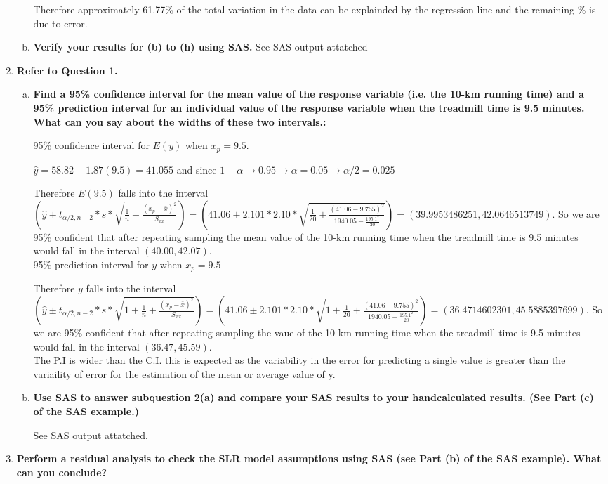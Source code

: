 \documentclass{article}
\begin{document}
\begin{enumerate}[1.]
\begin{enumerate}[(a)]
Therefore approximately 61.77\% of the total variation in the data can be explainded by the regression line and the remaining \% is due to error.

  \item \textbf{Verify your results for (b) to (h) using SAS.}
See SAS output attatched


\end{enumerate}

\item \textbf{Refer to Question 1.}
\begin{enumerate}[(a)]
\item \textbf{Find a 95\% confidence interval for the mean
value of the response variable (i.e. the 10-km running time) and a 95\% prediction
interval for an individual value of the response variable when the treadmill time is 9.5
minutes. What can you say about the widths of these two intervals.:}


95\% confidence interval for $E(y)$ when $x_p =9.5$. 

$\hat{y} = 58.82 - 1.87(9.5) = 41.055$ and since $1 - \alpha \to 0.95 \to \alpha = 0.05 \to \alpha/2 = 0.025$

Therefore $E(9.5)$ falls into the interval $(\hat{y} \pm t_{\alpha/2, n-2} * s * \sqrt{ \frac{1}{n} + \frac{(x_p - \bar{x})^2}{S_{xx}}}) = (41.06 \pm 2.101 * 2.10 * \sqrt{\frac{1}{20} + \frac{(41.06 - 9.755)^2}{ 1940.05 - \frac{195.1^2}{20}} }) = (39.9953486251, 42.0646513749)$. So we are 95\% confident that after repeating sampling the mean value of the 10-km running time when the treadmill time is 9.5 minutes would fall in the interval $(40.00, 42.07)$. \\

95\% prediction interval for $y$ when $x_p = 9.5$

Therefore $y$ falls into the interval $(\hat{y} \pm t_{\alpha/2, n-2} * s * \sqrt{ 1+ \frac{1}{n} + \frac{(x_p - \bar{x})^2}{S_{xx}}}) = (41.06 \pm 2.101 * 2.10 * \sqrt{1 + \frac{1}{20} + \frac{(41.06 - 9.755)^2}{ 1940.05 - \frac{195.1^2}{20}} }) = (36.4714602301, 45.5885397699)$. So we are 95\% confident that after repeating sampling the vaue of the 10-km running time when the treadmill time is 9.5 minutes would fall in the interval $(36.47, 45.59)$. \\

The P.I is wider than the C.I. this is expected as the variability in the error for predicting a single value is greater than the variaility of error for the estimation of the mean or average value of y.

\item \textbf{Use SAS to answer subquestion 2(a) and compare your SAS results to your handcalculated results. (See Part (c) of the SAS example.)}

See SAS output attatched.

\end{enumerate}

\item \textbf{Perform a residual analysis to check the SLR model assumptions using SAS (see Part (b) of
the SAS example). What can you conclude?}

\end{enumerate}
\end{document}
